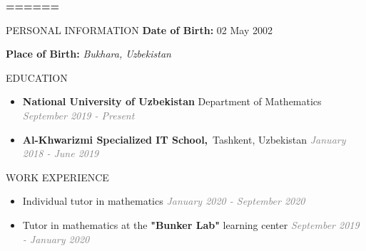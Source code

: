 \documentclass{resume} %
\begin{document}

\centerline{\textbf{\color{blue}=\color{red}=\color{orange}=\color{blue}=\color{green}=\color{red}=}}

\begin{rSection}{PERSONAL INFORMATION}
 \textbf{Date of Birth:} 02 May 2002 
 
 \textbf{Place of Birth:} \textit{Bukhara, Uzbekistan}
\end{rSection}
\begin{rSection}{{EDUCATION}}
	\begin{itemize}
		\item {\bf National University of Uzbekistan} Department of Mathematics \hfill \textcolor{gray}{\em September 2019 - Present} 
		
		 
		\item {\bf Al-Khwarizmi Specialized IT School,}~Tashkent, Uzbekistan \hfill \textcolor{gray}{\em January 2018 - June 2019}
		
	\end{itemize}

\end{rSection}






\begin{rSection}{WORK EXPERIENCE}
\begin{itemize}
	\item Individual tutor in mathematics \hfill\textcolor{gray}{\emph{January 2020 - September 2020}}
	\item Tutor in mathematics at the \textbf{"Bunker Lab"} learning center \hfill\textcolor{gray}{\emph{September 2019 - January 2020}}
	
	
	
\end{itemize}
\end{rSection}
\end{document}
